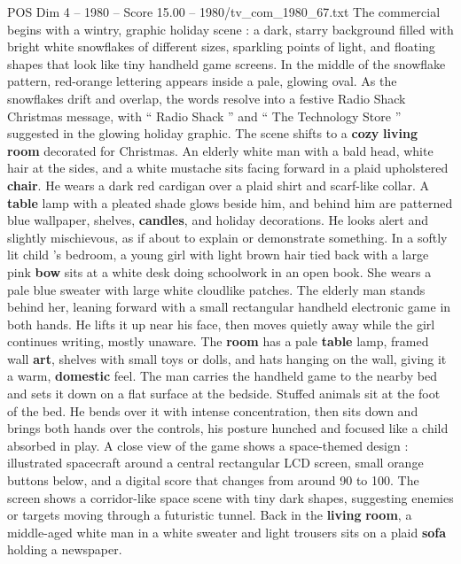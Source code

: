 \begin{textsample}{POS Dim 4 – 1980 – Score 15.00 – 1980/tv\_com\_1980\_67.txt}  \label{ex:f4_pos_043}
The commercial begins with a wintry, graphic holiday scene : a dark, starry background filled with bright white snowflakes of different sizes, sparkling points of light, and floating shapes that look like tiny handheld game screens.
In the middle of the snowflake pattern, red-orange lettering appears inside a pale, glowing oval.
As the snowflakes drift and overlap, the words resolve into a festive Radio Shack Christmas message, with “ Radio Shack ” and “ The Technology Store ” suggested in the glowing holiday graphic.
The scene shifts to a \textbf{cozy} \textbf{living} \textbf{room} decorated for Christmas.
An elderly white man with a bald head, white hair at the sides, and a white mustache sits facing forward in a plaid upholstered \textbf{chair}.
He wears a dark red cardigan over a plaid shirt and scarf-like collar.
A \textbf{table} lamp with a pleated shade glows beside him, and behind him are patterned blue wallpaper, shelves, \textbf{candles}, and holiday decorations.
He looks alert and slightly mischievous, as if about to explain or demonstrate something.
In a softly lit child ’s bedroom, a young girl with light brown hair tied back with a large pink \textbf{bow} sits at a white desk doing schoolwork in an open book.
She wears a pale blue sweater with large white cloudlike patches.
The elderly man stands behind her, leaning forward with a small rectangular handheld electronic game in both hands.
He lifts it up near his face, then moves quietly away while the girl continues writing, mostly unaware.
The \textbf{room} has a pale \textbf{table} lamp, framed wall \textbf{art}, shelves with small toys or dolls, and hats hanging on the wall, giving it a warm, \textbf{domestic} feel.
The man carries the handheld game to the nearby bed and sets it down on a flat surface at the bedside.
Stuffed animals sit at the foot of the bed.
He bends over it with intense concentration, then sits down and brings both hands over the controls, his posture hunched and focused like a child absorbed in play.
A close view of the game shows a space-themed design : illustrated spacecraft around a central rectangular LCD screen, small orange buttons below, and a digital score that changes from around 90 to 100.
The screen shows a corridor-like space scene with tiny dark shapes, suggesting enemies or targets moving through a futuristic tunnel.
Back in the \textbf{living} \textbf{room}, a middle-aged white man in a white sweater and light trousers sits on a plaid \textbf{sofa} holding a newspaper.

\end{textsample}

